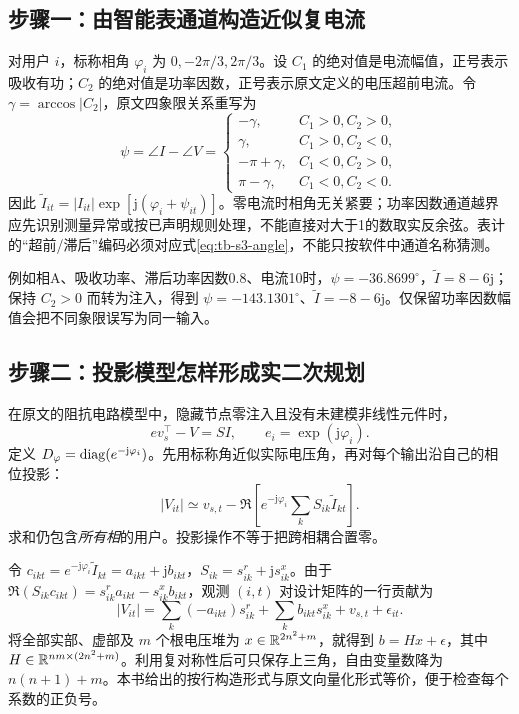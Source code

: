 \subsection{步骤一：由智能表通道构造近似复电流}
对用户 $i$，标称相角 $\varphi_i$ 为 $0,-2\pi/3,2\pi/3$。设 $C_1$ 的绝对值是电流幅值，正号表示吸收有功；$C_2$ 的绝对值是功率因数，正号表示原文定义的电压超前电流。令 $\gamma=\arccos|C_2|$，原文四象限关系重写为
\begin{equation}
 \psi=\angle I-\angle V=
 \begin{cases}
 -\gamma,&C_1>0,C_2>0,\\
 \gamma,&C_1>0,C_2<0,\\
 -\pi+\gamma,&C_1<0,C_2>0,\\
 \pi-\gamma,&C_1<0,C_2<0.
 \end{cases}\label{eq:tb-s3-angle}
\end{equation}
因此 $\widetilde I_{it}=|I_{it}|\exp[\mathrm j(\varphi_i+\psi_{it})]$。零电流时相角无关紧要；功率因数通道越界应先识别测量异常或按已声明规则处理，不能直接对大于1的数取实反余弦。表计的“超前/滞后”编码必须对应式\eqref{eq:tb-s3-angle}，不能只按软件中通道名称猜测。

例如相A、吸收功率、滞后功率因数0.8、电流10时，$\psi=-36.8699^\circ$，$\widetilde I=8-6\mathrm j$；保持 $C_2>0$ 而转为注入，得到 $\psi=-143.1301^\circ$、$\widetilde I=-8-6\mathrm j$。仅保留功率因数幅值会把不同象限误写为同一输入。

\subsection{步骤二：投影模型怎样形成实二次规划}
在原文的阻抗电路模型中，隐藏节点零注入且没有未建模非线性元件时，
\begin{equation}
 e v_s^\top-V=SI,\qquad e_i=\exp(\mathrm j\varphi_i).
\end{equation}
定义 $D_\varphi=\operatorname{diag}(e^{-\mathrm j\varphi_i})$。先用标称角近似实际电压角，再对每个输出沿自己的相位投影：
\begin{equation}
 |V_{it}|\simeq v_{s,t}
 -\Re\!\left[e^{-\mathrm j\varphi_i}\sum_kS_{ik}\widetilde I_{kt}\right].
 \label{eq:tb-s3-proj}
\end{equation}
求和仍包含\emph{所有相}的用户。投影操作不等于把跨相耦合置零。

令 $c_{ikt}=e^{-\mathrm j\varphi_i}\widetilde I_{kt}=a_{ikt}+\mathrm j b_{ikt}$，$S_{ik}=s^r_{ik}+\mathrm j s^x_{ik}$。由于
$\Re(S_{ik}c_{ikt})=s^r_{ik}a_{ikt}-s^x_{ik}b_{ikt}$，观测 $(i,t)$ 对设计矩阵的一行贡献为
\begin{equation}
 |V_{it}|=\sum_k(-a_{ikt})s^r_{ik}
 +\sum_k b_{ikt}s^x_{ik}+v_{s,t}+\epsilon_{it}.
 \label{eq:tb-s3-row}
\end{equation}
将全部实部、虚部及 $m$ 个根电压堆为 $x\in\mathbb{R}^{2n^2+m}$，就得到 $b=Hx+\epsilon$，其中 $H\in\mathbb{R}^{nm\times(2n^2+m)}$。利用复对称性后可只保存上三角，自由变量数降为 $n(n+1)+m$。本书给出的按行构造形式与原文向量化形式等价，便于检查每个系数的正负号。

